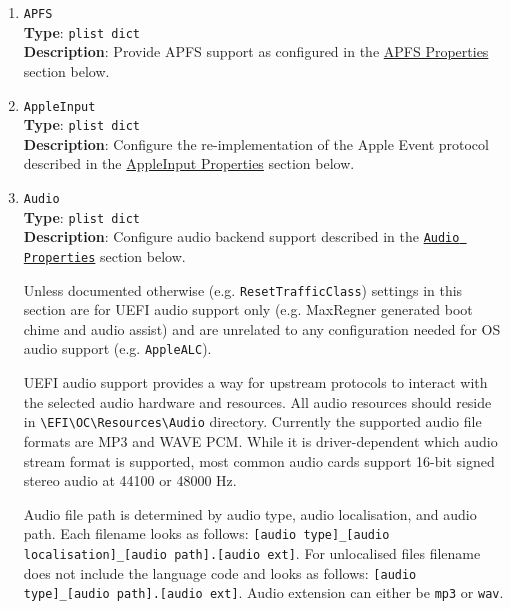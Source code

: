 \documentclass[]{article}
\begin{document}
\begin{enumerate}

\item
  \texttt{APFS}\\
  \textbf{Type}: \texttt{plist\ dict}\\
  \textbf{Description}: Provide APFS support as configured in the
  \hyperref[uefiapfsprops]{APFS Properties} section below.

\item
  \texttt{AppleInput}\\
  \textbf{Type}: \texttt{plist\ dict}\\
  \textbf{Description}: Configure the re-implementation of the Apple Event protocol
  described in the \hyperref[uefiappleinputprops]{AppleInput Properties} section below.

\item
  \texttt{Audio}\\
  \textbf{Type}: \texttt{plist\ dict}\\
  \textbf{Description}: Configure audio backend support described
  in the \hyperref[uefiaudioprops]{\texttt{Audio Properties}} section below.

  Unless documented otherwise (e.g. \texttt{ResetTrafficClass}) settings in this section
  are for UEFI audio support only (e.g. MaxRegner generated boot chime and audio assist) and are
  unrelated to any configuration needed for OS audio support (e.g. \texttt{AppleALC}).

  UEFI audio support provides a way for upstream protocols to interact with the
  selected audio hardware and resources. All audio resources should reside
  in \texttt{\textbackslash EFI\textbackslash OC\textbackslash Resources\textbackslash Audio}
  directory. Currently the supported audio file formats are MP3 and WAVE PCM. While it is
  driver-dependent which audio stream format is supported, most common audio cards
  support 16-bit signed stereo audio at 44100 or 48000 Hz.

  Audio file path is determined by audio type, audio localisation, and audio path. Each filename
  looks as follows: \texttt{[audio type]\_[audio localisation]\_[audio path].[audio ext]}.
  For unlocalised files filename does not include the language code and looks as follows:
  \texttt{[audio type]\_[audio path].[audio ext]}. Audio extension can either be \texttt{mp3}
  or \texttt{wav}.


\end{enumerate}
\end{document}
